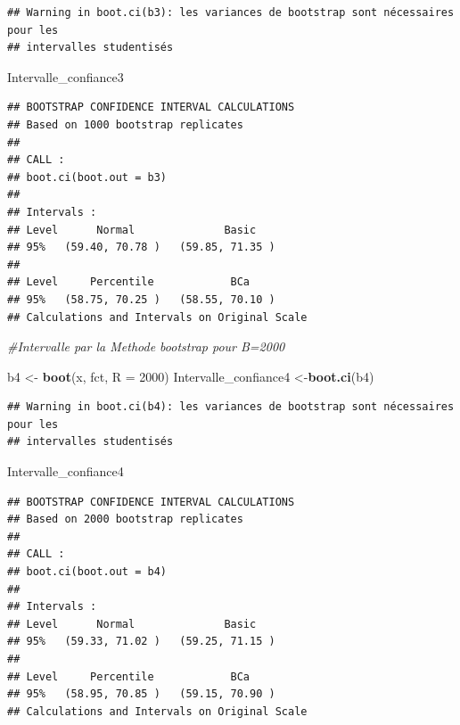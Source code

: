 \documentclass[
]{article}
\newenvironment{Shaded}{\begin{snugshade}}{\end{snugshade}}
\newcommand{\AttributeTok}[1]{\textcolor[rgb]{0.13,0.29,0.53}{#1}}
\newcommand{\CommentTok}[1]{\textcolor[rgb]{0.56,0.35,0.01}{\textit{#1}}}
\newcommand{\DecValTok}[1]{\textcolor[rgb]{0.00,0.00,0.81}{#1}}
\newcommand{\FunctionTok}[1]{\textcolor[rgb]{0.13,0.29,0.53}{\textbf{#1}}}
\newcommand{\NormalTok}[1]{#1}
\newcommand{\OtherTok}[1]{\textcolor[rgb]{0.56,0.35,0.01}{#1}}
\begin{document}
\begin{verbatim}
## Warning in boot.ci(b3): les variances de bootstrap sont nécessaires pour les
## intervalles studentisés
\end{verbatim}

\begin{Shaded}
\begin{Highlighting}[]
\NormalTok{Intervalle\_confiance3}
\end{Highlighting}
\end{Shaded}

\begin{verbatim}
## BOOTSTRAP CONFIDENCE INTERVAL CALCULATIONS
## Based on 1000 bootstrap replicates
## 
## CALL : 
## boot.ci(boot.out = b3)
## 
## Intervals : 
## Level      Normal              Basic         
## 95%   (59.40, 70.78 )   (59.85, 71.35 )  
## 
## Level     Percentile            BCa          
## 95%   (58.75, 70.25 )   (58.55, 70.10 )  
## Calculations and Intervals on Original Scale
\end{verbatim}

\begin{Shaded}
\begin{Highlighting}[]
 \CommentTok{\#Intervalle par la Methode bootstrap pour B=2000}

\NormalTok{b4 }\OtherTok{\textless{}{-}} \FunctionTok{boot}\NormalTok{(x, fct, }\AttributeTok{R =} \DecValTok{2000}\NormalTok{)}
\NormalTok{Intervalle\_confiance4 }\OtherTok{\textless{}{-}}\FunctionTok{boot.ci}\NormalTok{(b4)}
\end{Highlighting}
\end{Shaded}

\begin{verbatim}
## Warning in boot.ci(b4): les variances de bootstrap sont nécessaires pour les
## intervalles studentisés
\end{verbatim}

\begin{Shaded}
\begin{Highlighting}[]
\NormalTok{Intervalle\_confiance4}
\end{Highlighting}
\end{Shaded}

\begin{verbatim}
## BOOTSTRAP CONFIDENCE INTERVAL CALCULATIONS
## Based on 2000 bootstrap replicates
## 
## CALL : 
## boot.ci(boot.out = b4)
## 
## Intervals : 
## Level      Normal              Basic         
## 95%   (59.33, 71.02 )   (59.25, 71.15 )  
## 
## Level     Percentile            BCa          
## 95%   (58.95, 70.85 )   (59.15, 70.90 )  
## Calculations and Intervals on Original Scale
\end{verbatim}
\end{document}
